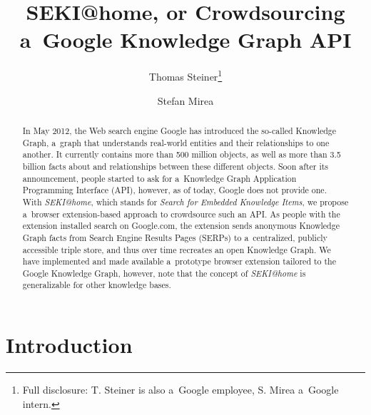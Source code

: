 \documentclass[runningheads,a4paper]{llncs}
\begin{document}
\title{SEKI@home, or Crowdsourcing\\ a~Google Knowledge Graph API}

\author{
  Thomas Steiner\thanks{Full disclosure: T. Steiner is also a~Google employee, S. Mirea a~Google intern.} \and
  Stefan Mirea
}


\maketitle
\setcounter{footnote}{0}

\begin{abstract}
In May 2012, the Web search engine Google has introduced the so-called Knowledge Graph,
a~graph that understands real-world entities and their relationships to one another.
It currently contains more than 500 million objects,
as well as more than 3.5 billion facts about
and relationships between these different objects.
Soon after its announcement, people started to ask
for a~Knowledge Graph Application Programming Interface (API),
however, as of today, Google does not provide one.
With \emph{SEKI@home}, which stands for \emph{Search for Embedded Knowledge Items},
we propose a~browser extension-based approach to crowdsource such an API.
As people with the extension installed search on Google.com,
the extension sends anonymous Knowledge Graph facts from Search Engine Results Pages (SERPs)
to a~centralized, publicly accessible triple store,
and thus over time recreates an open Knowledge Graph.
We have implemented and made available a~prototype browser extension
tailored to the Google Knowledge Graph, however,
note that the concept of \emph{SEKI@home} is generalizable for other knowledge bases.
\end{abstract}

\section{Introduction}
\end{document}
